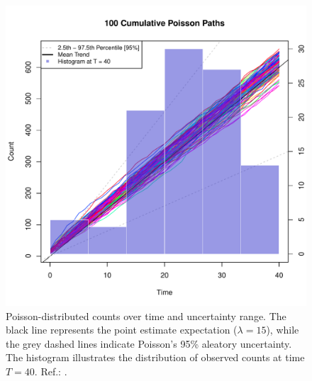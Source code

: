\begin{figure}
\begin{knitrout}
\color{fgcolor}

{\centering \includegraphics[width=\textwidth-3cm]{figure/ch02_figunnamed-chunk-3-1} 

}


\end{knitrout}
  \caption{Poisson-distributed counts over time and uncertainty range. The black line represents the point estimate expectation ($\lambda = 15$), while the grey dashed lines indicate Poisson's 95\% aleatory uncertainty. The histogram illustrates the distribution of observed counts at time $T = 40$. Ref.: \cite{spiegelhalter2011visualizing}.}
  \label{fig:2_2}
\end{figure}


